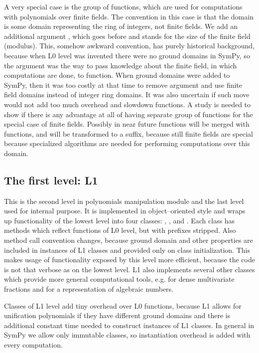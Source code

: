 A very special case is the group of  functions, which are used for computations with polynomials
over finite fields. The convention in this case is that the domain  is some domain representing
the ring of integers, not finite fields. We add an additional argument , which goes before 
and stands for the size of the finite field (modulus). This, somehow awkward convention, has purely
historical background, because when L0 level was invented there were no ground domains in SymPy, so
the argument  was the way to pass knowledge about the finite field, in which computations are
done, to  function. When ground domains were added to SymPy, then it was too costly at that
time to remove argument  and use finite field domains instead of integer ring domains. It was
also uncertain if such move would not add too much overhead and slowdown  functions. A study
is needed to show if there is any advantage at all of having separate group of functions for the
special case of finite fields. Possibly in near future  functions will be merged with 
functions, and  will be transformed to a suffix, because still finite fields are special
because specialized algorithms are needed for performing computations over this domain.


\subsection{The first level: L1}

This is the second level in polynomials manipulation module and the last level used for internal
purpose. It is implemented in object--oriented style and wraps up functionality of the lowest
level into four classes: , ,  and . Each class has methods which
reflect functions of L0 level, but with prefixes stripped. Also method call convention changes,
because ground domain and other properties are included in instances of L1 classes and provided
only on class initialization. This makes usage of functionality exposed by this level more
efficient, because the code is not that verbose as on the lowest level. L1 also implements
several other classes which provide more general computational tools, e.g.  for dense
multivariate fractions and  for a representation of algebraic numbers.

Classes of L1 level add tiny overhead over L0 functions, because L1 allows for unification
polynomials if they have different ground domains and there is additional constant time
needed to construct instances of L1 classes. In general in SymPy we allow only immutable
classes, so instantiation overhead is added with every computation.

